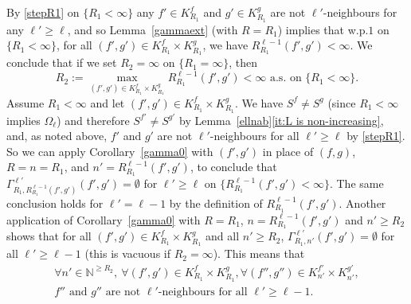 \documentclass[12pt]{article}
\makeatletter
\renewenvironment{proof}[1][\proofname]{%
\par\pushQED{\qed}\normalfont%
\topsep6\p@\@plus6\p@\relax
\trivlist\item[\hskip\labelsep\bfseries#1\@addpunct{.}]%
\ignorespaces
}{%
\popQED\endtrivlist\@endpefalse
}
\numberwithin{theorem}{section}
\theoremstyle{def}
\numberwithin{equation}{section}
\newcommand{\N}{\mathbb{N}}
\makeatother
\begin{document}
\begin{proof}[Proof of Lemma~\ref{disjcells}]
By \eqref{stepR1} on $\{R_1<\infty\}$ any $f'\in K^f_{R_1}$ and $g'\in K^g_{R_1}$ are not $\ell'$-neighbours for any $\ell'\ge \ell$, and so Lemma~\ref{gammaext} (with $R=R_1$) implies that w.p.$1$ on $\{R_1<\infty\}$, for all $(f',g')\in K^f_{R_1}\times K^g_{R_1}$, we have  $R^{\ell-1}_{R_1}(f',g')<\infty$.  
We conclude that if we set $R_2=\infty$ on $\{R_1=\infty\}$, then 
\begin{equation}\label{R2fin}R_2:=\max_{(f',g')\in K^f_{R_1}\times K^g_{R_1}}R^{\ell-1}_{R_1}(f',g')<\infty\text{ a.s.\ on }\{R_1<\infty\}.
\end{equation}
Assume $R_1<\infty$ and let $(f',g')\in K^f_{R_1}\times K^g_{R_1}$. 
We have $S^f\neq S^g$ (since $R_1<\infty$ implies $\Omega_\ell$) and therefore $S^{f'}\neq S^{g'}$ by Lemma~\ref{ellnab}\ref{it:L is non-increasing}, and, as noted above, $f'$ and $g'$ are not $\ell'$-neighbours for all $\ell'\ge \ell$ by \eqref{stepR1}. 
So we can apply Corollary~\ref{gamma0} with $(f',g')$ in place of $(f,g)$, $R=n=R_1$,  and $n' = R^{\ell-1}_{R_1}(f',g')$, to conclude that $\Gamma^{\ell'}_{R_1,R^{\ell-1}_{R_1}(f',g')}(f',g')=\emptyset$ for $\ell'\ge \ell$ on $\{R^{\ell-1}_{R_1}(f',g')<\infty\}$. 
The same conclusion holds for $\ell'=\ell-1$ by the definition of 
$R^{\ell-1}_{R_1}(f',g')$. 
Another application of Corollary~\ref{gamma0} with $R=R_1$, $n=R^{\ell-1}_{R_1}(f',g')$ and $n'\ge R_2$ shows that
for all $(f',g')\in K^f_{R_1}\times K^g_{R_1}$ and all $n'\ge R_2$, $\Gamma^{\ell'}_{R_1,n'}(f',g')=\emptyset$ for all $\ell'\ge \ell-1$ (this is vacuous if $R_2=\infty$).  
This means that
\begin{multline}\label{noneighb}
\forall n'\in\N^{\ge R_2}, \ \forall (f',g')\in K^f_{R_1}\times K^g_{R_1}, \forall (f'',g'')\in K^{f'}_{n'}\times K^{g'}_{n'}, \\
\text{$f''$ and $g''$ are not $\ell'$-neighbours for all $\ell'\ge \ell-1$}.
\end{multline}

\end{proof}
\end{document}
